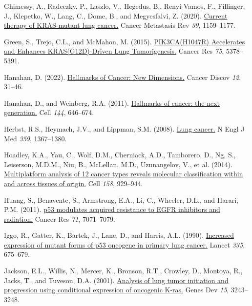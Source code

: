 \begin{CSLReferences}{0}{0}
\leavevmode{}%
Ghimessy, A., Radeczky, P., Laszlo, V., Hegedus, B., Renyi-Vamos, F., Fillinger, J., Klepetko, W., Lang, C., Dome, B., and Megyesfalvi, Z. (2020). \href{https://doi.org/10.1007/s10555-020-09903-9}{Current therapy of KRAS-mutant lung cancer.} Cancer Metastasis Rev \emph{39}, 1159--1177.

\leavevmode{}%
Green, S., Trejo, C.L., and McMahon, M. (2015). \href{https://doi.org/10.1158/0008-5472.can-15-1249}{PIK3CA(H1047R) Accelerates and Enhances KRAS(G12D)-Driven Lung Tumorigenesis.} Cancer Res \emph{75}, 5378--5391.

\leavevmode{}%
Hanahan, D. (2022). \href{https://doi.org/10.1158/2159-8290.cd-21-1059}{Hallmarks of Cancer: New Dimensions.} Cancer Discov \emph{12}, 31--46.

\leavevmode{}%
Hanahan, D., and Weinberg, R.A. (2011). \href{https://doi.org/10.1016/j.cell.2011.02.013}{Hallmarks of cancer: the next generation.} Cell \emph{144}, 646--674.

\leavevmode{}%
Herbst, R.S., Heymach, J.V., and Lippman, S.M. (2008). \href{https://doi.org/10.1056/nejmra0802714}{Lung cancer.} N Engl J Med \emph{359}, 1367--1380.

\leavevmode{}%
Hoadley, K.A., Yau, C., Wolf, D.M., Cherniack, A.D., Tamborero, D., Ng, S., Leiserson, M.D.M., Niu, B., McLellan, M.D., Uzunangelov, V., et al. (2014). \href{https://doi.org/10.1016/j.cell.2014.06.049}{Multiplatform analysis of 12 cancer types reveals molecular classification within and across tissues of origin.} Cell \emph{158}, 929--944.

\leavevmode{}%
Huang, S., Benavente, S., Armstrong, E.A., Li, C., Wheeler, D.L., and Harari, P.M. (2011). \href{https://doi.org/10.1158/0008-5472.can-11-0128}{p53 modulates acquired resistance to EGFR inhibitors and radiation.} Cancer Res \emph{71}, 7071--7079.

\leavevmode{}%
Iggo, R., Gatter, K., Bartek, J., Lane, D., and Harris, A.L. (1990). \href{https://doi.org/10.1016/0140-6736(90)90801-b}{Increased expression of mutant forms of p53 oncogene in primary lung cancer.} Lancet \emph{335}, 675--679.

\leavevmode{}%
Jackson, E.L., Willis, N., Mercer, K., Bronson, R.T., Crowley, D., Montoya, R., Jacks, T., and Tuveson, D.A. (2001). \href{https://doi.org/10.1101/gad.943001}{Analysis of lung tumor initiation and progression using conditional expression of oncogenic K-ras.} Genes Dev \emph{15}, 3243--3248.


\end{CSLReferences}
